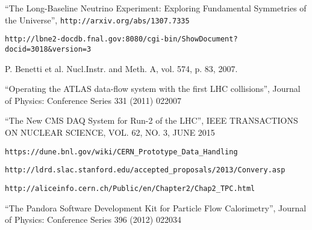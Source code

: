 \begin{thebibliography}{99}

 ``The Long-Baseline Neutrino Experiment: Exploring Fundamental Symmetries of the Universe'',  \verb!http://arxiv.org/abs/1307.7335!


 \verb!http://lbne2-docdb.fnal.gov:8080/cgi-bin/ShowDocument?docid=3018&version=3!

 P. Benetti et al. Nucl.Instr. and Meth. A, vol. 574, p. 83, 2007.

 ``Operating the ATLAS data-flow system with the first LHC collisions'', Journal of Physics: Conference Series 331 (2011) 022007

 ``The New CMS DAQ System for Run-2 of the LHC'', IEEE TRANSACTIONS ON NUCLEAR SCIENCE, VOL. 62, NO. 3, JUNE 2015

 \verb!https://dune.bnl.gov/wiki/CERN_Prototype_Data_Handling!

 \verb!http://ldrd.slac.stanford.edu/accepted_proposals/2013/Convery.asp!

 \verb!http://aliceinfo.cern.ch/Public/en/Chapter2/Chap2_TPC.html!

 ``The Pandora Software Development Kit for Particle Flow Calorimetry'', Journal of Physics: Conference Series 396 (2012) 022034

\end{thebibliography}